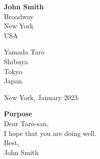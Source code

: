 \documentclass[a4paper,11.5pt,twoside]{article}
\begin{document}
\thispagestyle{empty}

\textbf{John Smith} \\
Broadway \\
New York \\
USA

\bigskip
\bigskip

Yamada Tarō \\
Shibuya \\
Tokyo \\
Japan \\

\bigskip
\bigskip

\hfill New York, January 2023\\

\bigskip
\bigskip

\textbf{Purpose}\\

Dear Tarō-san, \\

I hope that you are doing well. \\

Best, \\

John Smith
\end{document}
